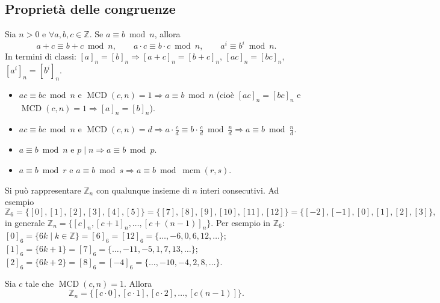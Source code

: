 \documentclass[11pt,a4paper]{article}
\begin{document}
\subsection{Proprietà delle congruenze}

\begin{proprieta}[Corollario]
Sia $n > 0$ e $\forall a, b, c \in \mathbb{Z}$. Se $a \equiv b \bmod n$, allora
\[
  a + c \equiv b + c \bmod n, \qquad a\cdot c \equiv b\cdot c \bmod n, \qquad a^i \equiv b^i \bmod n .
\]
In termini di classi: $[a]_n = [b]_n \Rightarrow [a + c]_n = [b + c]_n$, $[ac]_n = [bc]_n$, $[a^i]_n = [b^i]_n$.
\end{proprieta}

\begin{proprieta}
\begin{itemize}
  \item $ac \equiv bc \bmod n$ e $\operatorname{MCD}(c, n) = 1 \Rightarrow a \equiv b \bmod n$ (cioè $[ac]_n = [bc]_n$ e $\operatorname{MCD}(c, n) = 1 \Rightarrow [a]_n = [b]_n$).
  \item $ac \equiv bc \bmod n$ e $\operatorname{MCD}(c, n) = d \Rightarrow a\cdot\frac{c}{d} \equiv b\cdot\frac{c}{d} \bmod \frac{n}{d} \Rightarrow a \equiv b \bmod \frac{n}{d}$.
  \item $a \equiv b \bmod n$ e $p \mid n \Rightarrow a \equiv b \bmod p$.
  \item $a \equiv b \bmod r$ e $a \equiv b \bmod s \Rightarrow a \equiv b \bmod \operatorname{mcm}(r, s)$.
\end{itemize}
\end{proprieta}

\begin{osservazione}
Si può rappresentare $\mathbb{Z}_n$ con qualunque insieme di $n$ interi consecutivi. Ad esempio
\[
  \mathbb{Z}_6 = \{[0], [1], [2], [3], [4], [5]\} = \{[7], [8], [9], [10], [11], [12]\} = \{[-2], [-1], [0], [1], [2], [3]\},
\]
in generale $\mathbb{Z}_n = \{[c]_n, [c + 1]_n, \dots, [c + (n-1)]_n\}$. Per esempio in $\mathbb{Z}_6$: $[0]_6 = \{6k \mid k \in \mathbb{Z}\} = [6]_6 = [12]_6 = \{\dots, -6, 0, 6, 12, \dots\}$; $[1]_6 = \{6k + 1\} = [7]_6 = \{\dots, -11, -5, 1, 7, 13, \dots\}$; $[2]_6 = \{6k + 2\} = [8]_6 = [-4]_6 = \{\dots, -10, -4, 2, 8, \dots\}$.
\end{osservazione}

\begin{proposizione}
Sia $c$ tale che $\operatorname{MCD}(c, n) = 1$. Allora
\[
  \mathbb{Z}_n = \{[c\cdot 0], [c\cdot 1], [c\cdot 2], \dots, [c(n-1)]\} .
\]
\end{proposizione}
\end{document}
